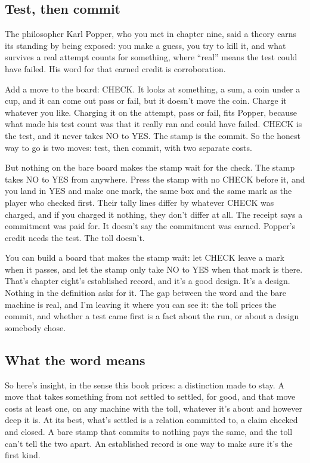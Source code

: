\documentclass[11pt,twoside]{article}
\theoremstyle{thielethm}
\theoremstyle{thieledef}
\theoremstyle{thieledef}
\theoremstyle{thieledef}
\theoremstyle{thielethm}
\theoremstyle{thieleobs}
\theoremstyle{thielethm}
\begin{document}
\subsection{Test, then commit}

The philosopher Karl Popper, who you met in chapter nine, said a theory earns its standing by being exposed: you make a guess, you try to kill it, and what survives a real attempt counts for something, where ``real'' means the test could have failed. His word for that earned credit is corroboration.

Add a move to the board: CHECK. It looks at something, a sum, a coin under a cup, and it can come out pass or fail, but it doesn't move the coin. Charge it whatever you like. Charging it on the attempt, pass or fail, fits Popper, because what made his test count was that it really ran and could have failed. CHECK is the test, and it never takes NO to YES. The stamp is the commit. So the honest way to go is two moves: test, then commit, with two separate costs.

But nothing on the bare board makes the stamp wait for the check. The stamp takes NO to YES from anywhere. Press the stamp with no CHECK before it, and you land in YES and make one mark, the same box and the same mark as the player who checked first. Their tally lines differ by whatever CHECK was charged, and if you charged it nothing, they don't differ at all. The receipt says a commitment was paid for. It doesn't say the commitment was earned. Popper's credit needs the test. The toll doesn't.

You can build a board that makes the stamp wait: let CHECK leave a mark when it passes, and let the stamp only take NO to YES when that mark is there. That's chapter eight's established record, and it's a good design. It's a design. Nothing in the definition asks for it. The gap between the word and the bare machine is real, and I'm leaving it where you can see it: the toll prices the commit, and whether a test came first is a fact about the run, or about a design somebody chose.

\subsection{What the word means}

So here's insight, in the sense this book prices: a distinction made to stay. A move that takes something from not settled to settled, for good, and that move costs at least one, on any machine with the toll, whatever it's about and however deep it is. At its best, what's settled is a relation committed to, a claim checked and closed. A bare stamp that commits to nothing pays the same, and the toll can't tell the two apart. An established record is one way to make sure it's the first kind.
\end{document}
